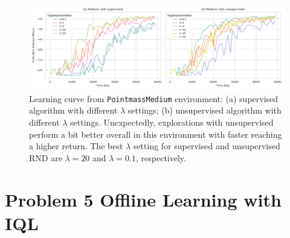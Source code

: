 \documentclass[10pt, letterpaper]{article}
\begin{document}
\begin{figure}[h!]
    \centering
    \includegraphics[width=\textwidth]{q4_medium.png}
    \caption{Learning curve from \texttt{PointmassMedium} environment: (a) supervised algorithm with different $\lambda$ settings; (b) unsupervised algorithm with different $\lambda$ settings. Unexpectedly, explorations with unsupervised perform a bit better overall in this environment with faster reaching a higher return. The best $\lambda$ setting for supervised and unsupervised RND are $\lambda=20$ and $\lambda=0.1$, respectively.}
\end{figure}

\pagebreak
\section*{Problem 5 Offline Learning with IQL}
\end{document}
